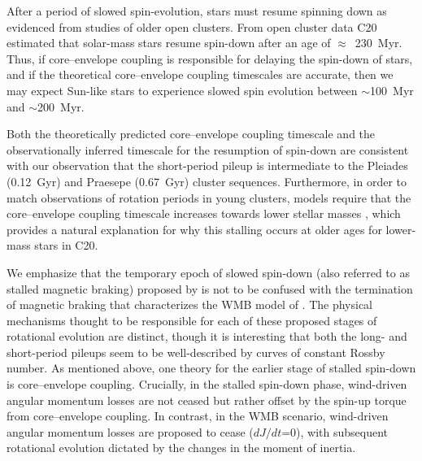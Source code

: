 \documentclass[trackchanges,twocolumn]{aastex631}
\newcommand{\curtis}{C20\xspace}
\begin{document}
After a period of slowed spin-evolution, stars must resume spinning down as evidenced from studies of older open clusters. From open cluster data \curtis estimated that solar-mass stars resume spin-down after an age of $\approx$~230~Myr. Thus, if core–envelope coupling is responsible for delaying the spin-down of stars, and if the theoretical core–envelope coupling timescales are accurate, then we may expect Sun-like stars to experience slowed spin evolution between $\sim$100~Myr and $\sim$200~Myr. 

Both the theoretically predicted core–envelope coupling timescale and the observationally inferred timescale for the resumption of spin-down are consistent with our observation that the short-period pileup is intermediate to the Pleiades (0.12~Gyr) and Praesepe (0.67~Gyr) cluster sequences. Furthermore, in order to match observations of rotation periods in young clusters, models require that the core–envelope coupling timescale increases towards lower stellar masses \citep[e.g.][]{Irwin2007, Denissenkov2010, GalletBouvier2015}, which provides a natural explanation for why this stalling occurs at older ages for lower-mass stars in \curtis. 

We emphasize that the temporary epoch of slowed spin-down (also referred to as stalled magnetic braking) proposed by \citet{Curtis2019a, Curtis2020} is not to be confused with the termination of magnetic braking that characterizes the WMB model of \citet{vanSaders2016, vanSaders2019}. The physical mechanisms thought to be responsible for each of these proposed stages of rotational evolution are distinct, though it is interesting that both the long- and short-period pileups seem to be well-described by curves of constant Rossby number. As mentioned above, one theory for the earlier stage of stalled spin-down is core–envelope coupling. Crucially, in the stalled spin-down phase, wind-driven angular momentum losses are not ceased but rather offset by the spin-up torque from core–envelope coupling. In contrast, in the WMB scenario, wind-driven angular momentum losses are proposed to cease ($dJ/dt$=0), with subsequent rotational evolution dictated by the changes in the moment of inertia. 
\end{document}
